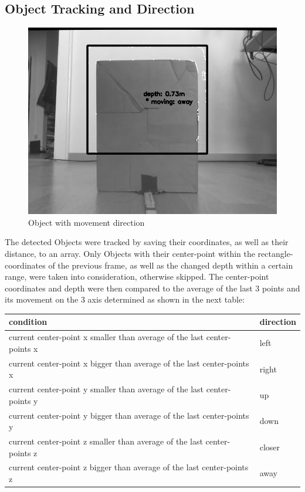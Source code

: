 \documentclass[journal,onecolumn]{IEEEtran}
\begin{document}
\subsection{Object Tracking and Direction}
\begin{figure}[H]
	\centering
	\includegraphics[scale=0.5]{box_direction.png}
	\captionsetup{justification=centering}
	\caption{Object with movement direction}
\end{figure}
\noindent The detected Objects were tracked by saving their coordinates, as well as their distance, to an array. Only Objects with their center-point within the rectangle-coordinates of the previous frame, as well as the changed depth within a certain range, were taken into consideration, otherwise skipped. The center-point coordinates and depth were then compared to the average of the last 3 points and its movement on the 3 axis determined as shown in the next table:
\begin{table}[H]
	\begin{tabular}{|l|l|}
		\hline
		condition & direction \\ \hline
		 current center-point x smaller than average of the last center-points x             & left               \\ \hline
		 current center-point x bigger than average of the last center-points x              & right               \\ \hline
		 current center-point y smaller than average of the last center-points y             & up               \\ \hline
		 current center-point y bigger than average of the last center-points y             & down             \\ \hline
		 current center-point z smaller than average of the last center-points z             & closer             \\ \hline
		 current center-point z bigger than average of the last center-points z              & away              \\ \hline
	\end{tabular}
\end{table}
\end{document}
